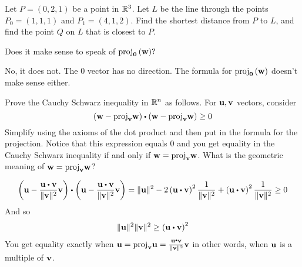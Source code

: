 \begin{enumialphparenastyle}
\begin{ex} Let $P = (0,2,1)$ be a point in $\mathbb{R}^3$. Let $L$ be the line through the points $P_0 = (1, 1, 1)$ and $P_1 = (4, 1, 2)$. Find the shortest distance from $P$ to $L$, and find the point $Q$ on $L$ that is closest to $P$. 
\end{ex}

\begin{ex} Does it make sense to speak of $\mbox{proj}_{{\bf 0}}\left( {\bf w}\right) ?$
\begin{sol}
No, it does not. The $0$ vector has no direction. The formula for $\mbox{proj}_{{\bf 0}}\left( {\bf w}\right)$ doesn't make sense either.
\end{sol}
\end{ex}

\begin{ex} Prove the Cauchy Schwarz inequality in $\mathbb{R}^{n}$ as follows.
For ${\bf u},{\bf v}$ vectors, consider 
\begin{equation*}
\left( \vect{w}-
\func{proj}_{\vect{v}}\vect{w}\right) \dotprod \left( \vect{w}-
\func{proj}_{\vect{v}}\vect{w}\right) \geq 0
\end{equation*}
Simplify using the axioms of the dot product and then put in the formula
for the projection. Notice that this expression equals $0$ and you get equality
in the Cauchy Schwarz inequality if and only if 
${\bf w}=\mbox{proj}_{{\bf v}}{\bf w}$. What is the geometric meaning of 
${\bf w}=\mbox{proj}_{{\bf v}}{\bf w}$?
\begin{sol}
\[
\left( \vect{u}-\frac{\vect{u}\dotprod \vect{v}}{\vectlength \vect{v}\vectlength
^{2}}\vect{v}\right) \dotprod \left( \vect{u}-\frac{\vect{u}\dotprod \vect{v}}{\vectlength \vect{v}\vectlength ^{2}}\vect{v}\right) =\vectlength \vect{u
}\vectlength ^{2}-2\left( \vect{u}\dotprod \vect{v}\right) ^{2}\frac{1}{\vectlength
\vect{v}\vectlength ^{2}}+\left( \vect{u}\dotprod \vect{v}\right) ^{2}\frac{1}{
\vectlength \vect{v}\vectlength ^{2}}\geq 0
\]
And so
\[
\vectlength \vect{u}\vectlength ^{2}\vectlength \vect{v}\vectlength
^{2}\geq \left( \vect{u}\dotprod \vect{v}\right) ^{2}
\]
You get equality exactly when $\vect{u}=\func{proj}_{\vect{v}}\vect{u}
= \frac{\vect{u}\dotprod \vect{v}}{\vectlength \vect{v}\vectlength ^{2}}\vect{v}$
in other words, when ${\bf u}$ is a multiple of ${\bf v}$.
\end{sol}
\end{ex}



\end{enumialphparenastyle}
